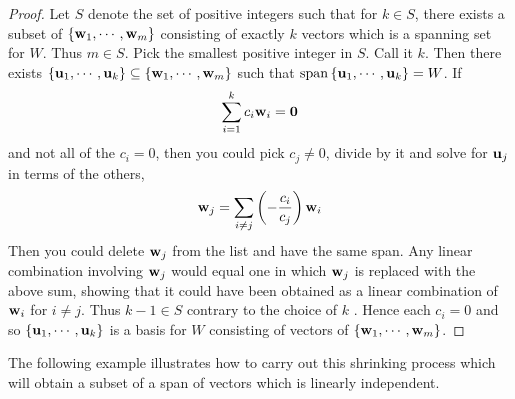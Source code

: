 \begin{proof}
Let $S$ denote the set of positive integers such that for $
k\in S$, there exists a subset of $\left\{\mbox{\bf w}_{1},\cdots ,\mbox{\bf w}_{m}\right\} $ consisting of exactly $k$ vectors
which is a spanning set for $W$. Thus $m\in S$. Pick the smallest positive
integer in $S$. Call it $k$. Then there exists $\left\{\mbox{\bf u}_{1},\cdots ,
\mbox{\bf u}_{k}\right\} \subseteq \left\{\mbox{\bf w}_{1},\cdots ,\mbox{\bf w}
_{m}\right\} $ such that $\sspan\set{\vect{u}_{1},\cdots ,\vect{u}
_{k}} =W$. If 
\begin{equation*}
\sum_{i=1}^{k}c_{i}\mbox{\bf w}_{i}=\mbox{\bf 0}
\end{equation*}
and not all of the $c_{i}=0$, then you could pick $c_{j}\neq 0$, divide by
it and solve for $\mbox{\bf u}_{j}$ in terms of the others, 
\begin{equation*}
\mbox{\bf w}_{j}=\sum_{i\neq j}\left(-\frac{c_{i}}{c_{j}}\right) \mbox{\bf w}_{i}
\end{equation*}
Then you could delete $\mbox{\bf w}_{j}$ from the list and have the same span. Any linear combination involving $\mbox{\bf w}_{j}$ would equal one in which $\mbox{\bf w}_{j}$ is replaced with the
above sum, showing that it could have been obtained as a linear combination
of $\mbox{\bf w}_{i}$ for $i\neq j$. Thus $k-1\in S$ contrary to the choice of $k$
. Hence each $c_{i}=0$ and so $\left\{\mbox{\bf u}_{1},\cdots ,\mbox{\bf u}
_{k}\right\} $ is a basis for $W$ consisting of vectors of $\left\{\mbox{\bf w}
_{1},\cdots ,\mbox{\bf w}_{m}\right\}$.
\end{proof}

The following example illustrates how to carry out this shrinking process which will obtain a subset of a span
of vectors which is linearly independent.

